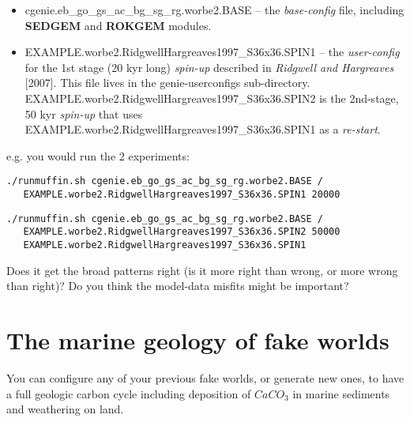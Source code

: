 \documentclass[11pt,fleqn]{book} %
\begin{document}
\begin{itemize}[noitemsep]
\vspace{1mm}
\item \textsf{\footnotesize cgenie.eb\_go\_gs\_ac\_bg\_sg\_rg.worbe2.BASE } -- the \textit{base-config} file, including \textbf{SEDGEM} and \textbf{ROKGEM} modules.
\vspace{1mm}
\item \textsf{\footnotesize EXAMPLE.worbe2.RidgwellHargreaves1997\_S36x36.SPIN1 } -- the \textit{user-config} for the 1st stage (20 kyr long) \textit{spin-up} described in  \textit{Ridgwell and Hargreaves} [2007]. This file lives in the \textsf{\footnotesize genie-userconfigs } sub-directory.
\\\textsf{\footnotesize EXAMPLE.worbe2.RidgwellHargreaves1997\_S36x36.SPIN2 } is the 2nd-stage, 50 kyr \textit{spin-up} that uses \textsf{\footnotesize EXAMPLE.worbe2.RidgwellHargreaves1997\_S36x36.SPIN1 } as a \textit{re-start}.
\end{itemize}
\vspace{1mm}
e.g. you would run the 2 experiments:
\vspace{-1mm}\small\begin{verbatim}
./runmuffin.sh cgenie.eb_go_gs_ac_bg_sg_rg.worbe2.BASE /
   EXAMPLE.worbe2.RidgwellHargreaves1997_S36x36.SPIN1 20000
\end{verbatim}\normalsize\vspace{-2mm}
\vspace{-2mm}\small\begin{verbatim}
./runmuffin.sh cgenie.eb_go_gs_ac_bg_sg_rg.worbe2.BASE /
   EXAMPLE.worbe2.RidgwellHargreaves1997_S36x36.SPIN2 50000
   EXAMPLE.worbe2.RidgwellHargreaves1997_S36x36.SPIN1
\end{verbatim}\normalsize\vspace{-1mm}

Does it get the broad patterns right (is it more right than wrong, or more wrong than right)? Do you think the model-data misfits might be important?



\newpage


\section{The marine geology of fake worlds}

You can configure any of your previous fake worlds, or generate new ones, to have a full geologic carbon cycle including deposition of \(CaCO_{3}\) in marine sediments and weathering on land.
\end{document}
